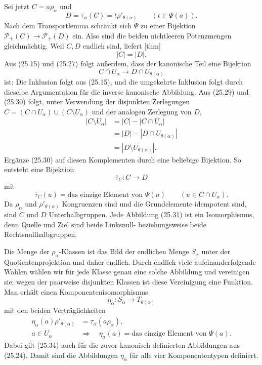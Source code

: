 \documentclass[main.tex]{subfiles}
\begin{document}
Sei jetzt \(C=a\rho_\alpha\) und
\[
 D=\tau_\alpha(C)
   =t\rho'_{\theta(\alpha)}\qquad(t\in\Psi(a)).            \tag{25.28}
\]
Nach dem Transportlemma schränkt sich \(\Psi\) zu einer Bijektion
\(\mathcal P_+(C)\to\mathcal P_+(D)\) ein.  Also sind die beiden
nichtleeren Potenzmengen gleichmächtig.  Weil \(C,D\) endlich sind,
liefert
[thm]
\[
  |C|=|D|.                                                  \tag{25.29}
\]
Aus (25.15) und (25.27) folgt außerdem, dass der kanonische Teil eine
Bijektion
\[
 C\cap U_\alpha\longrightarrow
 D\cap U_{\theta(\alpha)}                                 \tag{25.30}
\]
ist: Die Inklusion folgt aus (25.15), und die umgekehrte Inklusion folgt
durch dieselbe Argumentation für die inverse kanonische Abbildung.  Aus
(25.29) und (25.30) folgt, unter Verwendung der disjunkten Zerlegungen
\(C=(C\cap U_\alpha)\cup(C\setminus U_\alpha)\) und der
analogen Zerlegung von \(D\),
\[
\begin{aligned}
 |C\setminus U_\alpha|
 &=|C|-|C\cap U_\alpha|\\
 &=|D|-|D\cap U_{\theta(\alpha)}|\\
 &=|D\setminus U_{\theta(\alpha)}|.
\end{aligned}
\]
Ergänze (25.30) auf diesen Komplementen durch eine beliebige Bijektion.
So entsteht eine Bijektion
\[
  \overline\tau_C\colon C\longrightarrow D               \tag{25.31}
\]
mit
\[
 \overline\tau_C(u)=\text{das einzige Element von }\Psi(u)
 \qquad(u\in C\cap U_\alpha).                             \tag{25.32}
\]
Da \(\rho_\alpha\) und \(\rho'_{\theta(\alpha)}\) Kongruenzen sind und
die Grundelemente idempotent sind, sind \(C\) und \(D\) Unterhalbgruppen.
Jede Abbildung (25.31) ist ein Isomorphismus, denn Quelle und Ziel sind
beide Linksnull- beziehungsweise beide Rechtsnullhalbgruppen.

Die Menge der \(\rho_\alpha\)-Klassen ist das Bild der endlichen Menge
\(S_\alpha\) unter der Quotientenprojektion und daher endlich.  Durch
endlich viele aufeinanderfolgende Wahlen wählen wir für jede Klasse genau
eine solche Abbildung und vereinigen sie; wegen der paarweise disjunkten
Klassen ist diese Vereinigung eine Funktion.  Man erhält einen
Komponentenisomorphismus
\[
 \eta_\alpha\colon S_\alpha\longrightarrow
 T_{\theta(\alpha)}                                       \tag{25.33}
\]
mit den beiden Verträglichkeiten
\begin{align}
 \eta_\alpha(a)\rho'_{\theta(\alpha)}
    &=\tau_\alpha(a\rho_\alpha),                         \tag{25.34}\\
 a\in U_\alpha\quad&\Longrightarrow\quad
 \eta_\alpha(a)=\text{das einzige Element von }\Psi(a). \tag{25.35}
\end{align}
Dabei gilt (25.34) auch für die zuvor kanonisch definierten Abbildungen
aus (25.24).  Damit sind die Abbildungen \(\eta_\alpha\) für alle vier
Komponententypen definiert.
\end{document}
